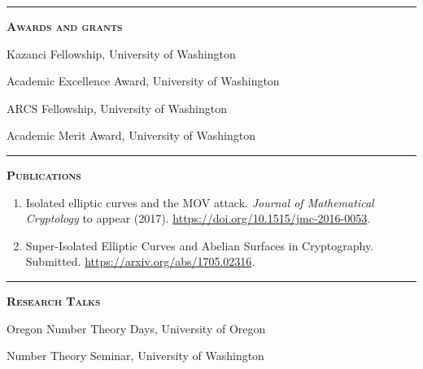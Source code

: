 \documentclass[12pt]{article}
\newcommand{\sectionheading}[1]
{
\bigskip %
\noindent
\hspace{-6.5mm}\textcolor{Gray}{\rule[.75mm]{21.5mm}{1mm}} %
\hspace{.2mm}	%
{\large{\textbf{\textsc{#1}}}} %
}
\newenvironment{date_section}
	{
	\vspace{-1ex}
	\leftmargini = 15ex
		\begin{itemize}[
			labelsep = *,
			labelwidth = 9ex,
			labelindent = 0ex,
			itemindent = !,
			font=\normalfont,
			align=parleft
		]{}
		\itemsep=-1.5mm
	}
	{\end{itemize}\vspace{-2ex}}
\newcommand{\yearmo}[2]{
	\item[
		{\makebox[1ex][r]{#1}}
		\hspace{1ex}
		{\makebox[1ex][l]{#2} }
		] }
\begin{document}
	\sectionheading{Awards and grants}%

		\begin{date_section}
			\yearmo{}{2017}%
				Kazanci Fellowship, University of Washington
			\yearmo{}{2014}%
				Academic Excellence Award, University of Washington
			\yearmo{}{2013}%
				ARCS Fellowship, University of Washington
			\yearmo{}{2013}%
				Academic Merit Award, University of Washington
		\end{date_section}

	\sectionheading{Publications}%
	
	\begin{enumerate}[itemsep=-1mm, leftmargin=24mm]
		
		\item
		{Isolated elliptic curves and the MOV attack.}
		\textit{Journal of Mathematical Cryptology} to appear (2017). \url{https://doi.org/10.1515/jmc-2016-0053}.
		
		\item
		{Super-Isolated Elliptic Curves and Abelian Surfaces in Cryptography.}
		Submitted.
		\url{https://arxiv.org/abs/1705.02316}.
		
	\end{enumerate}

	\sectionheading{Research Talks} %

		\begin{date_section}

			\yearmo{2017}{Oct.} %
			Oregon Number Theory Days,
			University of Oregon
			
			\yearmo{2017}{May.} %
			Number Theory Seminar,
			University of Washington

		\end{date_section}
\end{document}
